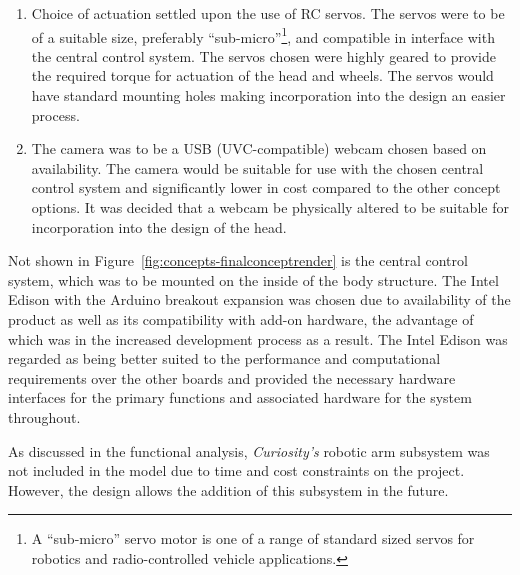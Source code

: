 \begin{enumerate}[label=\Alph*.]
      \item Choice of actuation settled upon the use of RC servos. The servos were to be of a suitable size, preferably ``sub-micro''\footnote{A ``sub-micro'' servo motor is one of a range of standard sized servos for robotics and radio-controlled vehicle applications.}, and compatible in interface with the central control system. The servos chosen were highly geared to provide the required torque for actuation of the head and wheels. The servos would have standard mounting holes making incorporation into the design an easier process.
      \item The camera was to be a USB (UVC-compatible) webcam chosen based on availability. The camera would be suitable for use with the chosen central control system and significantly lower in cost compared to the other concept options. It was decided that a webcam be physically altered to be suitable for incorporation into the design of the head.
    \end{enumerate}
    
    Not shown in Figure~\ref{fig:concepts-finalconceptrender} is the central control system, which was to be mounted on the inside of the body structure. The Intel Edison with the Arduino breakout expansion was chosen due to availability of the product as well as its compatibility with add-on hardware, the advantage of which was in the increased development process as a result. The Intel Edison was regarded as being better suited to the performance and computational requirements over the other boards and provided the necessary hardware interfaces for the primary functions and associated hardware for the system throughout.
    
    As discussed in the functional analysis, \textit{Curiosity's} robotic arm subsystem was not included in the model due to time and cost constraints on the project. However, the design allows the addition of this subsystem in the future.

    